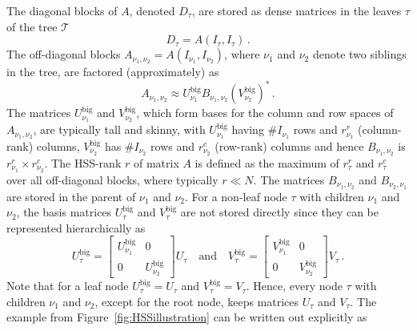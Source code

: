 \documentclass{article}
\begin{document}
The diagonal blocks of $A$, denoted $D_\tau$, are stored as dense
matrices in the leaves $\tau$ of the tree $\mathcal{T}$
\begin{equation}
  D_{\tau} = A(I_{\tau},I_{\tau}) \, .
\end{equation}
The off-diagonal blocks $A_{\nu_1,\nu_2} = A(I_{\nu_1},I_{\nu_2})$,
where $\nu_1$ and $\nu_2$ denote two siblings in the tree, are
factored (approximately) as
\begin{equation}
  A_{\nu_1,\nu_2} \approx U^{\mathrm{big}}_{\nu_1} B_{\nu_1,\nu_2} \left( V_{\nu_2}^{\mathrm{big}}\right)^*  \, .
\end{equation}
The matrices $U^{\mathrm{big}}_{\nu_1}$ and
$V_{\nu_2}^{\mathrm{big}}$, which form bases for the column and row
spaces of $A_{\nu_1,\nu_2}$, are typically tall and skinny, with
$U^{\mathrm{big}}_{\nu_1}$ having $\#I_{\nu_1}$ rows and $r^r_{\nu_1}$
(column-rank) columns, $V_{\nu_2}^{\mathrm{big}}$ has $\#I_{\nu_2}$
rows and $r^c_{\nu_2}$ (row-rank) columns and hence $B_{\nu_1,\nu_2}$
is $r^r_{\nu_1} \times r^c_{\nu_2}$. The HSS-rank $r$ of matrix $A$ is
defined as the maximum of $r^r_\tau$ and $r^c_\tau$ over all
off-diagonal blocks, where typically $r \ll N$. The matrices
$B_{\nu_1,\nu_2}$ and $B_{\nu_2,\nu_1}$ are stored in the parent of
$\nu_1$ and $\nu_2$. For a non-leaf node $\tau$ with children $\nu_1$
and $\nu_2$, the basis matrices $U^{\mathrm{big}}_\tau$ and
$V^{\mathrm{big}}_\tau$ are not stored directly since they can be
represented hierarchically as
\begin{equation}\label{eq:nestedUV}
  U^{\mathrm{big}}_{\tau} = \begin{bmatrix} U^{\mathrm{big}}_{\nu_1} & 0 \\ 0 & U^{\mathrm{big}}_{\nu_2} \end{bmatrix} U_\tau
  \quad \textrm{and} \quad
  V^{\mathrm{big}}_{\tau} = \begin{bmatrix} V^{\mathrm{big}}_{\nu_1} & 0 \\ 0 & V^{\mathrm{big}}_{\nu_2} \end{bmatrix} V_\tau \, .
\end{equation}
Note that for a leaf node $U^{\mathrm{big}}_\tau = U_\tau$ and
$V^{\mathrm{big}}_\tau = V_\tau$. Hence, every node $\tau$ with
children $\nu_1$ and $\nu_2$, except for the root node, keeps matrices
$U_\tau$ and $V_{\tau}$. The example from
Figure~\ref{fig:HSSillustration} can be written out explicitly as
\end{document}
